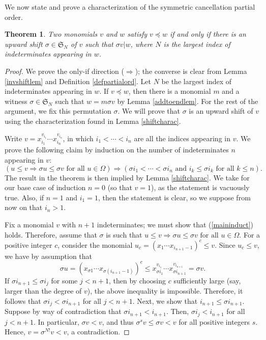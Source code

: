 \documentclass{amsart}
\newtheorem{theorem}{Theorem}[section]
\theoremstyle{definition}
\theoremstyle{remark}
\numberwithin{equation}{section}
\newcommand{\<}{\langle}
\renewcommand{\>}{\rangle}
\begin{document}
We now state and prove a characterization of the symmetric cancellation partial order.


\begin{theorem}\label{symordercharac}
Two monomials $v$ and $w$ satisfy  $v \preceq w$ if and only if
there is an upward shift $\sigma \in {\mathfrak S}_N$ of $v$ such that
$\sigma v | w$, where $N$ is the largest index of indeterminates appearing in $w$.
\end{theorem}
\begin{proof}
We prove the only-if direction ($\Rightarrow$);
the converse is clear from Lemma \ref{invshiftlem} and Definition \ref{defpartialord}.
Let $N$ be the largest index of indeterminates appearing in $w$.
If $v \preceq w$, then there is a monomial $m$ and a witness $\sigma \in {\mathfrak S}_N$
such that $w = m\sigma v$ by Lemma \ref{addtoendlem}.  
For the rest of the argument, we fix this permutation $\sigma$.
We will prove that $\sigma$ is an upward shift of $v$ using the 
characterization found in Lemma \ref{shiftcharac}.

Write $v = x_{i_1}^{v_{i_1}} \cdots x_{i_n}^{v_{i_n}}$, in 
which $i_1 < \cdots < i_n$ are all the indices appearing in $v$.
We prove the following claim by induction on the number of 
indeterminates $n$ appearing in $v$:
\begin{equation}\label{maininduct}
(u \leq v \Rightarrow  \sigma u \leq \sigma v  
\text{ for all } u \in \Omega) \Rightarrow ( \sigma i_{1} < \cdots < \sigma i_{n} \text{ and }
  i_k \leq \sigma i_k \text{ for all } k \leq n).
\end{equation}
The result in the theorem is then implied by Lemma \ref{shiftcharac}.
We take for our base case of induction $n = 0$ (so that $v = 1$),
as the statement is vacuously true.
Also, if $n = 1$ and $i_1 = 1$, then the statement is clear, 
so we suppose from now on that $i_n > 1$. 

Fix a monomial $v$ with $n+1$ indeterminates; we must show that 
(\ref{maininduct}) holds.  Therefore, assume that $\sigma$ is such that
$u \leq v \Rightarrow  \sigma u \leq \sigma v  
\text{ for all } u \in \Omega$.  For a positive integer $c$, consider the monomial 
$u_c =  (x_{1} \cdots x_{i_{n+1}-1})^c \leq v$.  Since $u_c \leq v$,
we have by assumption that
\[  \sigma u = (x_{\sigma 1} \cdots x_{\sigma (i_{n+1}-1)})^c  \leq 
x_{\sigma i_1}^{v_{i_1}} \cdots x_{\sigma i_{n+1}}^{v_{i_{n+1}}} = \sigma v.\]
If $\sigma i_{n+1} \leq \sigma i_j$ for some $j < n+1$, then
by choosing $c$ sufficiently large (say, larger than
the degree of $v$), 
the above inequality is impossible.
Therefore, it follows that  $\sigma i_j < \sigma i_{n+1}$ for all $j < n+1$.  Next, 
we show that $i_{n+1} \leq \sigma i_{n+1}$.  Suppose by way of contradiction
that $\sigma  i_{n+1} < i_{n+1}$.  Then, $\sigma  i_j < i_{n+1}$ for all $j < n+1$.
In particular, $\sigma v < v$, and thus $\sigma^s v \leq \sigma v < v$ for
all positive integers $s$.  Hence, $v = \sigma^{N!} v < v$, a contradiction.


\end{proof}
\end{document}
